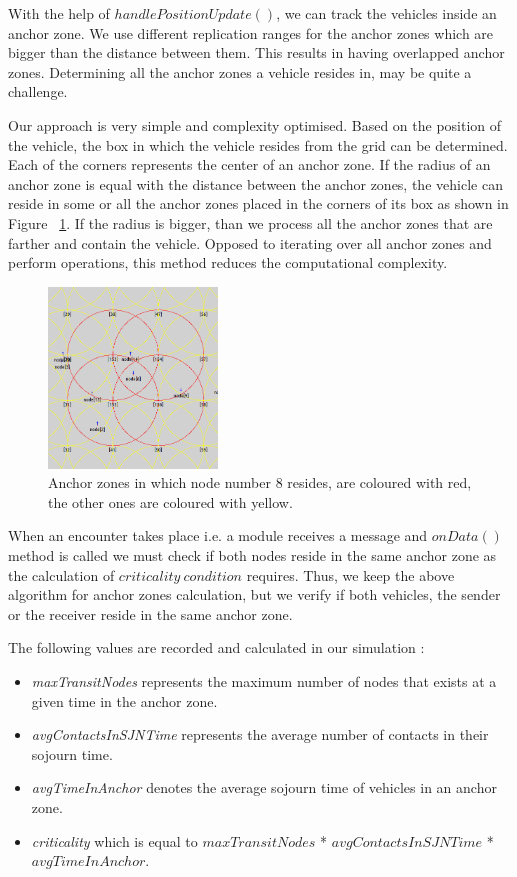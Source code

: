 With the help of $handlePositionUpdate()$, we can track the vehicles inside an
anchor zone. We use different replication ranges for the anchor zones which are
bigger than the distance between them. This results in having overlapped anchor
zones. Determining all the anchor zones a vehicle resides in, may be quite a
challenge.

Our approach is very simple and complexity optimised. Based on the position of
the vehicle, the box in which the vehicle resides from the grid can be
determined. Each of the corners represents the center of an anchor zone. If the
radius of an anchor zone is equal with the distance between the anchor zones,
the vehicle can reside in some or all the anchor zones placed in the corners of
its box as shown in Figure ~\ref{fig:node_az}. If the radius is bigger, than we
process all the anchor zones that are farther and contain the vehicle.
Opposed to iterating over all anchor zones and perform operations, this method
reduces the computational complexity.

\begin{figure}[t]
	\centering
	\includegraphics[width=0.4\textwidth]{img/node_az}
	\caption{Anchor zones in which node number 8 resides, are coloured with red,
	the other ones are coloured with yellow.}
	\label{fig:node_az}
\end{figure}

When an encounter takes place i.e. a module receives a message and $onData()$
method is called we must check if both nodes reside in the same anchor zone as
the calculation of $criticality\ condition$ requires. Thus, we keep the above
algorithm for anchor zones calculation, but we verify if both vehicles, the
sender or the receiver reside in the same anchor zone.

The following values are recorded and calculated in our simulation :
\begin{itemize}
	\item {\it maxTransitNodes} represents the maximum number of nodes that exists
	at a given time in the anchor zone.
	\item {\it avgContactsInSJNTime} represents the average number of contacts in
	their sojourn time.
	\item {\it avgTimeInAnchor} denotes the average sojourn time of vehicles in an
	anchor zone.
	\item {\it criticality} which is equal to $maxTransitNodes$ *
	$avgContactsInSJNTime$ * $avgTimeInAnchor$.
\end{itemize}

